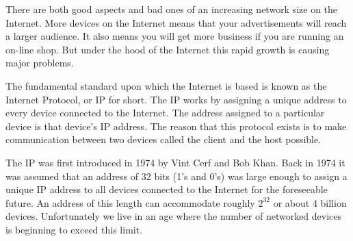 %

There are both good aspects and bad ones of an increasing network size on the Internet. More devices on the Internet
means that your advertisements will reach a larger audience. It also means you will get more business if 
you are running an on-line shop. But under the hood of the Internet this rapid growth is causing major problems. 


The fundamental standard upon which the Internet is based is known as the Internet Protocol, or IP for short. The IP works by assigning a unique address to every device connected to the Internet. The address assigned to a particular device is that device's IP address. The reason that this protocol exists is to make communication between two devices called the client and the host possible. 


The IP was first introduced in 1974 by Vint Cerf and Bob Khan\cite{1092259}. Back in 1974 it was assumed that an address of 32 bits (1's and 0's) was large enough to assign a unique IP address to all devices connected to the Internet for the foreseeable future. An address of this length can accommodate roughly $2^{32}$ or about 4 billion devices. Unfortunately we live in an age where the number of networked devices is beginning to exceed this limit.


 


   